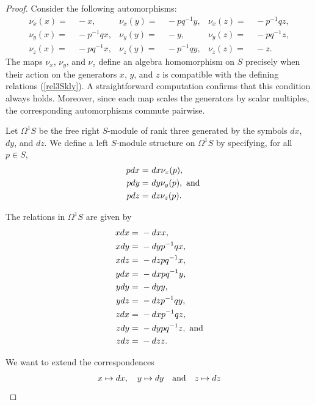\documentclass{amsart}
\theoremstyle{definition}
\theoremstyle{remark}
\numberwithin{equation}{section}
\begin{document}
\begin{proof}
Consider the following automorphisms:
\begin{align}
   \nu_{x}(x) = &\ -x, & \nu_{x}(y) = &\ -pq^{-1}y, & \nu_{x}(z) = &\ -p^{-1}qz, \label{Auto1} \\ 
    \nu_{y}(x) = &\ -p^{-1}qx, & \nu_{y}(y) = &\ -y, &  \nu_{y}(z) = &\ -pq^{-1}z, \label{Auto2} \\
    \nu_{z}(x) = &\ -pq^{-1}x, & \nu_z(y) = &\ -p^{-1}qy, & \nu_{z}(z) = &\ -z. \label{Auto3}
\end{align}
The maps $\nu_{x}$, $\nu_{y}$, and $\nu_{z}$ define an algebra homomorphism on $S$ precisely when their action on the generators $x$, $y$, and $z$ is compatible with the defining relations {\rm (}\ref{rel3Skly}{\rm )}. A straightforward computation confirms that this condition always holds. Moreover, since each map scales the generators by scalar multiples, the corresponding automorphisms commute pairwise.

Let $\Omega^{1}S$ be the free right $S$-module of rank three generated by the symbols $dx$, $dy$, and $dz$. We define a left $S$-module structure on $\Omega^{1}S$ by specifying, for all $p \in S$,
\begin{align}
    pdx = &\ dx \nu_{x}(p), \notag \\ \quad pdy = &\ dy\nu_{y}(p),\ {\rm and} \notag \\
    pdz = &\ dz\nu_{z}(p) \label{relrightmod}.
\end{align}

The relations in $\Omega^{1}S$ are given by 
\begin{align}
xdx = &\ -dx x, \notag \\
xdy = &\ -dyp^{-1}qx, \notag \\
xdz = &\ -dzpq^{-1}x, \label{rel1} \\
ydx = &\ -dxpq^{-1}y, \notag \\  
ydy = &\ -dyy, \notag \\
ydz = &\ -dzp^{-1}qy, \label{rel2} \\
zdx = &\ -dxp^{-1}qz, \notag \\
zdy = &\ -dypq^{-1}z, \ {\rm and} \notag \\
zdz = &\ -dzz. \label{rel3} 
\end{align}
    
We want to extend the correspondences 
\begin{equation*}
x \mapsto d x, \quad y \mapsto d y \quad {\rm and} \quad z\mapsto d z
\end{equation*} 


\end{proof}
\end{document}

